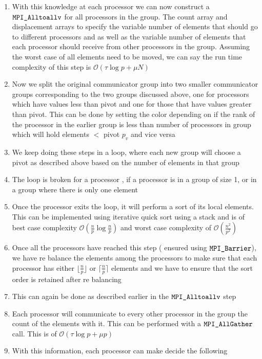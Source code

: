 \documentclass[twoside,11pt]{article}\usepackage{amsmath,amsfonts,amsthm,fullpage}
\begin{document}
\begin{enumerate}
\item
With this knowledge at each processor we can now construct a $\verb|MPI_Alltoallv|$ for all processors in the group. The count array and displacement arrays to specify the variable number of elements that should go to different processors and as well as the variable number of elements that each processor should receive from other processors in the group. Assuming the worst case of all elements need to be moved, we can say the run time complexity of this step is  $ \mathcal{O}(\tau \log p + \mu N )$
\item
Now we split the original communicator group into two smaller communicator groups corresponding to the two groups discussed above, one for processors which have values less than pivot and one for those that have values greater than pivot. This can be done by setting the color depending on if the rank of the processor in the earlier group is less than number of processors in group which will hold elements $<$ pivot $p_v$ and vice versa
\item
We keep doing these steps in a loop, where each new group will choose a pivot as described above based on the number of elements in that group
\item
The loop is broken for a processor , if a processor is in a group of size 1, or in a group where there is only one element
\item
Once the processor exits the loop, it will perform a sort of its local elements. This can be implemented using iterative quick sort using a stack and is of best case complexity  $\mathcal{O} (\frac{n}{p} \log \frac{n}{p})$ and worst case complexity of  $\mathcal{O}(\frac{n^2}{p^2})$
\item
Once all the processors have reached this step  ( ensured using $\verb|MPI_Barrier|$), we have re balance the elements among the processors to make sure that each processor has either $\lfloor
 \frac{n}{p}\rfloor$ or  $\lceil \frac{n}{p}\rceil$ elements and we have to ensure that the sort order is retained after re balancing
\item
This can again be done as described earlier in the $\verb|MPI_Alltoallv|$ step
\item
Each processor will communicate to every other processor in the group the count of the elements with it. This can be performed with a $\verb|MPI_AllGather|$ call. This is of $\mathcal{O}(\tau \log p + \mu p )$
\item
With this information, each processor can make decide the following 
\begin{enumerate}

\end{enumerate}
\end{enumerate}
\end{document}
